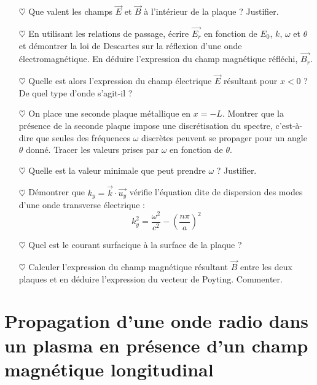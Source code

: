 \documentclass{report}
\begin{document}
\begin{itemize}
	
	\item[$\heartsuit$] Que valent les champs $\vec{E}$ et $\vec{B}$ à l'intérieur de la plaque ? Justifier.
	
	\item[$\heartsuit$] En utilisant les relations de passage, écrire $\vec{E_r}$ en fonction de $E_0$, $k$, $\omega$ et $\theta$ et démontrer la loi de Descartes sur la réflexion d'une onde électromagnétique. En déduire l'expression du champ magnétique réfléchi, $\vec{B_r}$.
	
	\item[$\heartsuit$] Quelle est alors l'expression du champ électrique $\vec{E}$ résultant pour $x<0$ ? De quel type d'onde s'agit-il ?
	
	\item[$\heartsuit$] 	On place une seconde plaque métallique en $x=-L$. Montrer que la présence de la seconde plaque impose une discrétisation du spectre, c'est-à-dire que seules des fréquences $\omega$ discrètes peuvent se propager pour un angle $\theta$ donné. Tracer les valeurs prises par $\omega$ en fonction de $\theta$. 
	\item[$\heartsuit$] Quelle est la valeur minimale que peut prendre $\omega$ ? Justifier. 
	
	\item[$\heartsuit$] Démontrer que $k_y=\vec{k}\cdot\vec{u_y}$ vérifie l'équation dite de dispersion des modes d'une onde transverse électrique : 
	\begin{equation}
		k_y^2=\frac{\omega^2}{c^2}-\left(\frac{n\pi}{a} \right)^2 
	\end{equation}
	
	\item[$\heartsuit$] Quel est le courant surfacique à la surface de la plaque ?
	
	\item[$\heartsuit$] Calculer l'expression du champ magnétique résultant $\vec{B}$ entre les deux plaques et en déduire l'expression du vecteur de Poyting. Commenter. 
	
\end{itemize}

\newpage

\section*{Propagation d'une onde radio dans un plasma en présence d'un champ magnétique longitudinal}
\end{document}

